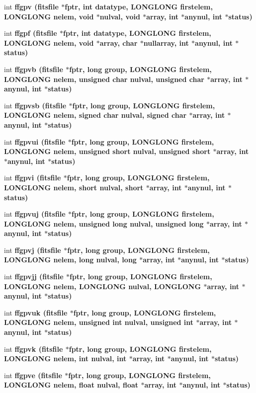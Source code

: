 \begin{CompactItemize}
\item 
int \bf{ffgpv} (\bf{fitsfile} $\ast$fptr, int \bf{datatype}, \bf{LONGLONG} firstelem, \bf{LONGLONG} nelem, void $\ast$nulval, void $\ast$array, int $\ast$anynul, int $\ast$status)
\item 
int \bf{ffgpf} (\bf{fitsfile} $\ast$fptr, int \bf{datatype}, \bf{LONGLONG} firstelem, \bf{LONGLONG} nelem, void $\ast$array, char $\ast$nullarray, int $\ast$anynul, int $\ast$status)
\item 
int \bf{ffgpvb} (\bf{fitsfile} $\ast$fptr, long group, \bf{LONGLONG} firstelem, \bf{LONGLONG} nelem, unsigned char nulval, unsigned char $\ast$array, int $\ast$anynul, int $\ast$status)
\item 
int \bf{ffgpvsb} (\bf{fitsfile} $\ast$fptr, long group, \bf{LONGLONG} firstelem, \bf{LONGLONG} nelem, signed char nulval, signed char $\ast$array, int $\ast$anynul, int $\ast$status)
\item 
int \bf{ffgpvui} (\bf{fitsfile} $\ast$fptr, long group, \bf{LONGLONG} firstelem, \bf{LONGLONG} nelem, unsigned short nulval, unsigned short $\ast$array, int $\ast$anynul, int $\ast$status)
\item 
int \bf{ffgpvi} (\bf{fitsfile} $\ast$fptr, long group, \bf{LONGLONG} firstelem, \bf{LONGLONG} nelem, short nulval, short $\ast$array, int $\ast$anynul, int $\ast$status)
\item 
int \bf{ffgpvuj} (\bf{fitsfile} $\ast$fptr, long group, \bf{LONGLONG} firstelem, \bf{LONGLONG} nelem, unsigned long nulval, unsigned long $\ast$array, int $\ast$anynul, int $\ast$status)
\item 
int \bf{ffgpvj} (\bf{fitsfile} $\ast$fptr, long group, \bf{LONGLONG} firstelem, \bf{LONGLONG} nelem, long nulval, long $\ast$array, int $\ast$anynul, int $\ast$status)
\item 
int \bf{ffgpvjj} (\bf{fitsfile} $\ast$fptr, long group, \bf{LONGLONG} firstelem, \bf{LONGLONG} nelem, \bf{LONGLONG} nulval, \bf{LONGLONG} $\ast$array, int $\ast$anynul, int $\ast$status)
\item 
int \bf{ffgpvuk} (\bf{fitsfile} $\ast$fptr, long group, \bf{LONGLONG} firstelem, \bf{LONGLONG} nelem, unsigned int nulval, unsigned int $\ast$array, int $\ast$anynul, int $\ast$status)
\item 
int \bf{ffgpvk} (\bf{fitsfile} $\ast$fptr, long group, \bf{LONGLONG} firstelem, \bf{LONGLONG} nelem, int nulval, int $\ast$array, int $\ast$anynul, int $\ast$status)
\item 
int \bf{ffgpve} (\bf{fitsfile} $\ast$fptr, long group, \bf{LONGLONG} firstelem, \bf{LONGLONG} nelem, float nulval, float $\ast$array, int $\ast$anynul, int $\ast$status)

\end{CompactItemize}
